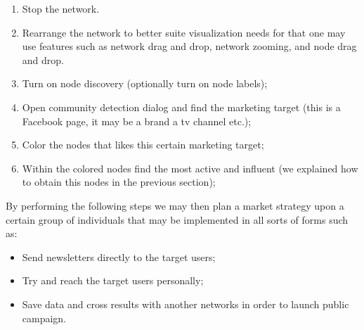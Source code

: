 \begin{enumerate}
    \item Stop the network.
    \item Rearrange the network to better suite visualization needs for that one may use features such as network drag and drop, network zooming, and node drag and drop.
    \item Turn on node discovery (optionally turn on node labels);
    \item Open community detection dialog and find the marketing target (this is a Facebook page, it may be a brand a tv channel etc.);
    \item Color the nodes that likes this certain marketing target;
    \item Within the colored nodes find the most active and influent (we explained how to obtain this nodes in the previous section);
\end{enumerate}

By performing the following steps we may then plan a market strategy upon a certain group of individuals that may be implemented in all sorts of forms such as:
\begin{itemize}
    \item Send newsletters directly to the target users;
    \item Try and reach the target users personally;
    \item Save data and cross results with another networks in order to launch public campaign.
\end{itemize}

